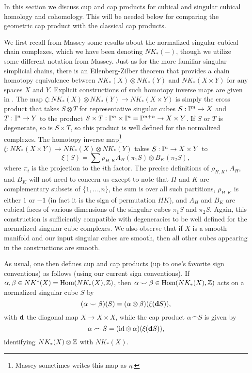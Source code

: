 In this section we discuss cup and cap products for cubical and singular cubical homology and cohomology. This will be needed below for comparing the geometric cap product with the classical cap products.

We first recall from Massey \cite[Chapter XI]{Mas91} some results about the normalized singular cubical chain complexes, which we have been denoting $NK_*(-)$, though we utilize some different notation from Massey. Just as for the more familiar singular simplicial chains, there is an Eilenberg-Zilber theorem that provides a chain homotopy equivalence between $NK_*(X) \otimes NK_*(Y)$ and $NK_*(X \times Y)$ for any spaces $X$ and $Y$. Explicit constructions of such homotopy inverse maps are given in \cite[Section XI.5]{Mas91}.
The map $\zeta: NK_*(X) \otimes NK_*(Y) \to NK_*(X \times Y)$ is simply the cross product that takes $S \otimes T$ for representative singular cubes $S: \mathbb{I}^m \to X$ and $T:\mathbb{I}^n \to Y$ to the product $S \times T:\mathbb{I}^m \times \mathbb{I}^n = \mathbb{I}^{m+n} \to X \times Y$. If $S$ or $T$ is degenerate, so is $S \times T$, so this product is well defined for the normalized complexes. The homotopy inverse map\footnote{Massey sometimes writes this map as $\eta$.} $\xi: NK_*(X \times Y) \to NK_*(X) \otimes NK_*(Y)$ takes $S:\mathbb{I}^n \to X \times Y$ to
$$\xi(S) = \sum \rho_{H,K}A_H(\pi_1S) \otimes B_K(\pi_2S),$$ where $\pi_i$ is the projection to the $i$th factor. The precise definitions of $\rho_{H,K}$, $A_H$, and $B_K$ will not need to concern us except to note that $H$ and $K$ are complementary subsets of $\{1,\ldots, n\}$, the sum is over all such partitions, $\rho_{H,K}$ is either $1$ or $-1$ (in fact it is the sign of permutation $HK$), and $A_H$ and $B_K$ are cubical faces of various dimensions of the singular cubes $\pi_1S$ and $\pi_2S$. Again, this construction is sufficiently compatible with degeneracies to be well defined for the normalized singular cube complexes. We also observe that if $X$ is a smooth manifold and our input singular cubes are smooth, then all other cubes appearing in the constructions are smooth.

As usual, one then defines cup and cap products (up to one's favorite sign conventions) as follows (using our current sign conventions). If $\alpha, \beta \in NK^*(X) = \textup{Hom}(NK_*(X),\mathbb{Z})$, then $\alpha\smile \beta \in \textup{Hom}(NK_*(X),\mathbb{Z})$ acts on a normalized singular cube $S$ by
\begin{equation}\label{E: cubical cup}
(\alpha \smile \beta)(S) = (\alpha \otimes \beta)(\xi(\mathbf{d} S)),
\end{equation}
with $\mathbf{d}$ the diagonal map $X \to X \times X$,
while the cap product $\alpha\frown S$ is given by
\begin{equation}\label{E: cubical cap}
\alpha\frown S = (\mathrm{id} \otimes \alpha) (\xi(\mathbf{d} S)),
\end{equation}
identifying $NK_*(X) \otimes \mathbb{Z}$ with $NK_*(X)$.



